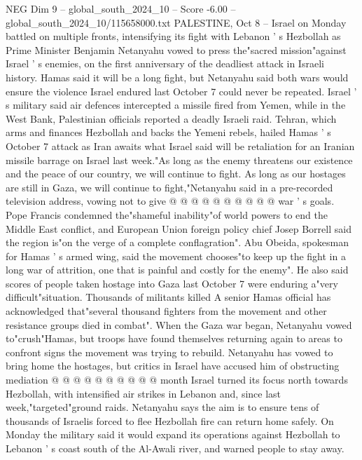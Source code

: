 \begin{textsample}{NEG Dim 9 – global\_south\_2024\_10 – Score -6.00 – global\_south\_2024\_10/115658000.txt}  \label{ex:f9_neg_275}
PALESTINE, Oct 8 -- Israel on Monday battled on multiple fronts, intensifying its fight with Lebanon ' s Hezbollah as Prime Minister Benjamin Netanyahu vowed to press the"sacred mission"against Israel ' s enemies, on the first anniversary of the deadliest attack in Israeli history.
Hamas said it will be a long fight, but Netanyahu said both wars would ensure the violence Israel endured last October 7 could never be repeated.
Israel ' s military said air defences intercepted a missile fired from Yemen, while in the West Bank, Palestinian officials reported a deadly Israeli raid.
Tehran, which arms and finances Hezbollah and backs the Yemeni rebels, hailed Hamas ' s October 7 attack as Iran awaits what Israel said will be retaliation for an Iranian missile barrage on Israel last week."As long as the enemy threatens our existence and the peace of our country, we will continue to fight.
As long as our hostages are still in Gaza, we will continue to fight,"Netanyahu said in a pre-recorded television address, vowing not to give @ @ @ @ @ @ @ @ @ @ war ' s goals.
Pope Francis condemned the"shameful inability"of world powers to end the Middle East conflict, and European Union foreign policy chief Josep Borrell said the region is"on the verge of a complete conflagration".
Abu Obeida, spokesman for Hamas ' s armed wing, said the movement chooses"to keep up the fight in a long war of attrition, one that is painful and costly for the enemy".
He also said scores of people taken hostage into Gaza last October 7 were enduring a"very difficult"situation.
Thousands of militants killed A senior Hamas official has acknowledged that"several thousand fighters from the movement and other resistance groups died in combat".
When the Gaza war began, Netanyahu vowed to"crush"Hamas, but troops have found themselves returning again to areas to confront signs the movement was trying to rebuild.
Netanyahu has vowed to bring home the hostages, but critics in Israel have accused him of obstructing mediation @ @ @ @ @ @ @ @ @ @ month Israel turned its focus north towards Hezbollah, with intensified air strikes in Lebanon and, since last week,"targeted"ground raids.
Netanyahu says the aim is to ensure tens of thousands of Israelis forced to flee Hezbollah fire can return home safely.
On Monday the military said it would expand its operations against Hezbollah to Lebanon ' s coast south of the Al-Awali river, and warned people to stay away.

\end{textsample}
